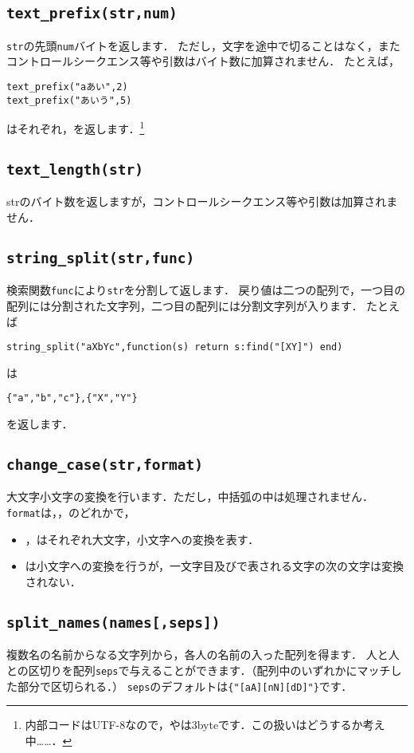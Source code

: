 \documentclass[a4paper]{ltjsarticle}
\newcommand{\luafunc}[1]{\texttt{#1}}
\newcommand*{\luavar}[1]{\texttt{#1}}
\begin{document}
\subsection{\luafunc{text\_prefix(str,num)}}
\luavar{str}の先頭\luavar{num}バイトを返します．
ただし，文字を途中で切ることはなく，またコントロールシークエンス等や引数はバイト数に加算されません．
たとえば，
\begin{lstlisting}
text_prefix("aあい",2)
text_prefix("あいう",5)
\end{lstlisting}
はそれぞれ，を返します．\footnote{内部コードはUTF-8なので，やは3byteです．この扱いはどうするか考え中……．}

\subsection{\luafunc{text\_length(str)}}
strのバイト数を返しますが，コントロールシークエンス等や引数は加算されません．

\subsection{\luafunc{string\_split(str,func)}}
検索関数\luavar{func}により\luavar{str}を分割して返します．
戻り値は二つの配列で，一つ目の配列には分割された文字列，二つ目の配列には分割文字列が入ります．
たとえば
\begin{lstlisting}
string_split("aXbYc",function(s) return s:find("[XY]") end)
\end{lstlisting}
は
\begin{lstlisting}
{"a","b","c"},{"X","Y"}
\end{lstlisting}
を返します．


\subsection{\luafunc{change\_case(str,format)}}
大文字小文字の変換を行います．ただし，中括弧の中は処理されません．
\luavar{format}は，，のどれかで，
\begin{itemize}
\item {}，はそれぞれ大文字，小文字への変換を表す．
\item {}は小文字への変換を行うが，一文字目及び\luastring{: *}で表される文字の次の文字は変換されない．
\end{itemize}


\subsection{\luafunc{split\_names(names[,seps])}}
複数名の名前からなる文字列から，各人の名前の入った配列を得ます．
人と人との区切りを配列\luavar{seps}で与えることができます．（配列中のいずれかにマッチした部分で区切られる．）
\luavar{seps}のデフォルトは\verb|{"[aA][nN][dD]"}|です．
\end{document}
